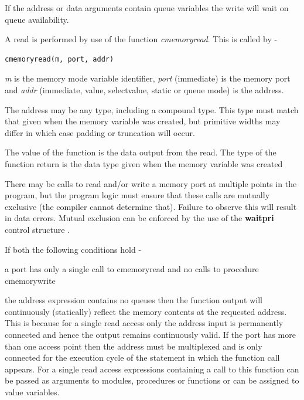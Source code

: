             If the address or data arguments contain queue variables the write
            will wait on queue availability.

            A read is performed by use of the function {\em cmemoryread}. This
            is called by -
            \begin{lstlisting}[gobble=12, language=threepl]
                   cmemoryread(m, port, addr)
            \end{lstlisting}
            {\em m} is the memory mode variable identifier, {\em port}
            (immediate) is the memory port and {\em addr} (immediate, value,
            selectvalue, static or queue mode) is the address.

            The address may be any type, including a compound type.
            This type must match that given when the memory variable
            was created, but primitive widths may differ in which case
            padding or truncation will occur.

            The value of the function is the data output from the read. The
            type of the function return is the data type given when the
            memory variable was created

            There may be calls to read and/or write a memory port at multiple
            points in the program, but the program logic must ensure that
            these calls are mutually exclusive (the compiler cannot determine
            that). Failure to observe this will result in data errors.
            Mutual exclusion can be enforced by the use of the {\bf waitpri}
            control structure .

            If both the following conditions hold -
            \blist
            \item   a port has only a single call to cmemoryread and no calls to
                    procedure cmemorywrite
            \item   the address expression contains no queues
            \blend
            then the function output will continuously (statically) reflect
            the memory contents at the requested address. This is because for
            a single read access only the address input is permanently
            connected and hence the output remains continuously valid. If the
            port has more than one access point then the address must be
            multiplexed and is only connected for the execution cycle of the
            statement in which the function call appears. For a single read
            access expressions containing a call to this function can be
            passed as arguments to modules, procedures or functions or can be
            assigned to value variables.

